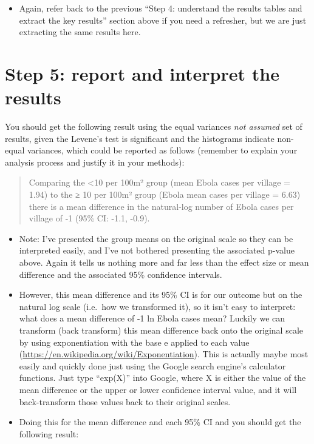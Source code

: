 \documentclass[
]{book}
\providecommand{\tightlist}{%
  \setlength{\itemsep}{0pt}\setlength{\parskip}{0pt}}
\begin{document}
\begin{itemize}
\tightlist
\item
  Again, refer back to the previous ``Step 4: understand the results tables and extract the key results'' section above if you need a refresher, but we are just extracting the same results here.
\end{itemize}

\hypertarget{step-5-report-and-interpret-the-results-1}{%
\section{Step 5: report and interpret the results}\label{step-5-report-and-interpret-the-results-1}}

You should get the following result using the equal variances \emph{not assumed} set of results, given the Levene's test is significant and the histograms indicate non-equal variances, which could be reported as follows (remember to explain your analysis process and justify it in your methods):

\begin{quote}
Comparing the \textless10 per 100m² group (mean Ebola cases per village = 1.94) to the ≥ 10 per 100m² group (Ebola mean cases per village = 6.63) there is a mean difference in the natural-log number of Ebola cases per village of -1 (95\% CI: -1.1, -0.9).
\end{quote}

\begin{itemize}
\item
  Note: I've presented the group means on the original scale so they can be interpreted easily, and I've not bothered presenting the associated p-value above. Again it tells us nothing more and far less than the effect size or mean difference and the associated 95\% confidence intervals.
\item
  However, this mean difference and its 95\% CI is for our outcome but on the natural log scale (i.e.~how we transformed it), so it isn't easy to interpret: what does a mean difference of -1 ln Ebola cases mean? Luckily we can transform (back transform) this mean difference back onto the original scale by using exponentiation with the base e applied to each value (\url{https://en.wikipedia.org/wiki/Exponentiation}). This is actually maybe most easily and quickly done just using the Google search engine's calculator functions. Just type ``exp(X)'' into Google, where X is either the value of the mean difference or the upper or lower confidence interval value, and it will back-transform those values back to their original scales.
\item
  Doing this for the mean difference and each 95\% CI and you should get the following result:
\end{itemize}
\end{document}
